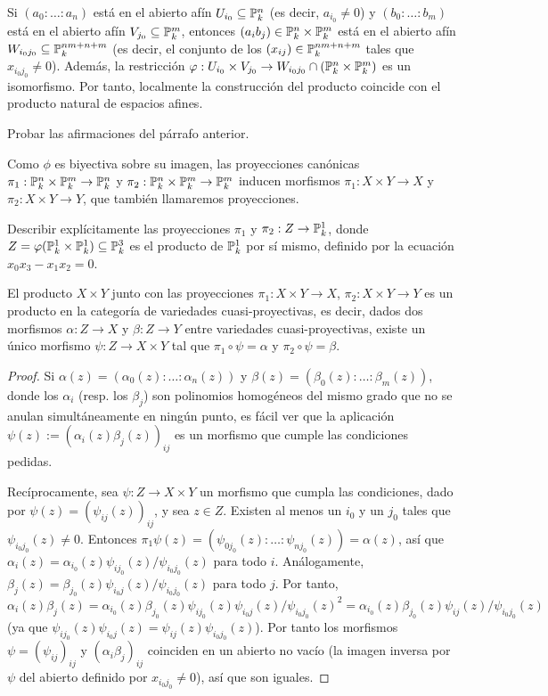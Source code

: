 \documentclass[ACGA.tex]{subfiles}
\begin{document}
Si $(a_0:\ldots:a_n)$ está en el abierto afín $U_{i_0}\subseteq\mathbb{P}^n_k$ (es decir, $a_{i_0}\neq 0$) y $(b_0:\ldots:b_m)$ está en el abierto afín $V_{j_0}\subseteq\mathbb{P}^m_k$, entonces $(a_ib_j)\in\mathbb{P}^n_k\times\mathbb{P}^m_k$ está en el abierto afín $W_{i_0j_0}\subseteq\mathbb{P}^{nm+n+m}_k$ (es decir, el conjunto de los $(x_{ij})\in\mathbb{P}^{nm+n+m}_k$ tales que $x_{i_0j_0}\neq 0$). Además, la restricción $\varphi:U_{i_0}\times V_{j_0}\to W_{i_0j_0}\cap(\mathbb{P}^n_k\times\mathbb{P}^m_k)$ es un isomorfismo. Por tanto, localmente la construcción del producto coincide con el producto natural de espacios afines.

\begin{ejer}
 Probar las afirmaciones del párrafo anterior.
\end{ejer}

Como $\phi$ es biyectiva sobre su imagen, las proyecciones canónicas $\pi_1:\mathbb{P}^n_k\times\mathbb{P}^m_k\to \mathbb{P}^n_k$ y $\pi_2:\mathbb{P}^n_k\times\mathbb{P}^m_k\to\mathbb{P}^m_k$ inducen morfismos $\pi_1:X\times Y\to X$ y $\pi_2:X\times Y\to Y$, que también llamaremos proyecciones. 
 
\begin{ejer}
 Describir explícitamente las proyecciones $\pi_1$ y $\pi_2:Z\to\mathbb{P}^1_k$, donde $Z=\varphi(\mathbb{P}^1_k\times\mathbb{P}^1_k)\subseteq\mathbb{P}^3_k$ es el producto de $\mathbb{P}^1_k$ por sí mismo, definido por la ecuación $x_0x_3-x_1x_2=0$. 
\end{ejer}


\begin{prop}
 El producto $X\times Y$ junto con las proyecciones $\pi_1:X\times Y\to X$, $\pi_2:X\times Y\to Y$ es un producto en la categoría de variedades cuasi-proyectivas, es decir, dados dos morfismos $\alpha:Z\to X$ y $\beta:Z\to Y$ entre variedades cuasi-proyectivas, existe un único morfismo $\psi:Z\to X\times Y$ tal que $\pi_1\circ\psi=\alpha$ y $\pi_2\circ\psi=\beta$.
\end{prop}

\begin{proof}
 Si $\alpha(z)=(\alpha_0(z):\ldots:\alpha_n(z))$ y $\beta(z)=(\beta_0(z):\ldots:\beta_m(z))$, donde los $\alpha_i$ (resp. los $\beta_j$) son polinomios homogéneos del mismo grado que no se anulan simultáneamente en ningún punto, es fácil ver que la aplicación $\psi(z):=(\alpha_i(z)\beta_j(z))_{ij}$ es un morfismo que cumple las condiciones pedidas. 

 Recíprocamente, sea $\psi:Z\to X\times Y$ un morfismo que cumpla las condiciones, dado por $\psi(z)=(\psi_{ij}(z))_{ij}$, y sea $z\in Z$. Existen al menos un $i_0$ y un $j_0$ tales que $\psi_{i_0j_0}(z)\neq 0$. Entonces $\pi_1\psi(z)=(\psi_{0j_0}(z):\ldots:\psi_{nj_0}(z))=\alpha(z)$, así que $\alpha_i(z)=\alpha_{i_0}(z)\psi_{ij_0}(z)/\psi_{i_0j_0}(z)$ para todo $i$. Análogamente, $\beta_j(z)=\beta_{j_0}(z)\psi_{i_0j}(z)/\psi_{i_0j_0}(z)$ para todo $j$. Por tanto, $$\alpha_i(z)\beta_j(z)=\alpha_{i_0}(z)\beta_{j_0}(z)\psi_{ij_0}(z)\psi_{i_0j}(z)/\psi_{i_0j_0}(z)^2=\alpha_{i_0}(z)\beta_{j_0}(z)\psi_{ij}(z)/\psi_{i_0j_0}(z)$$ (ya que $\psi_{ij_0}(z)\psi_{i_0j}(z)=\psi_{ij}(z)\psi_{i_0j_0}(z)$). Por tanto los morfismos $\psi=(\psi_{ij})_{ij}$ y $(\alpha_i\beta_j)_{ij}$ coinciden en un abierto no vacío (la imagen inversa por $\psi$ del abierto definido por $x_{i_0j_0}\neq 0$), así que son iguales.
\end{proof}
\end{document}

